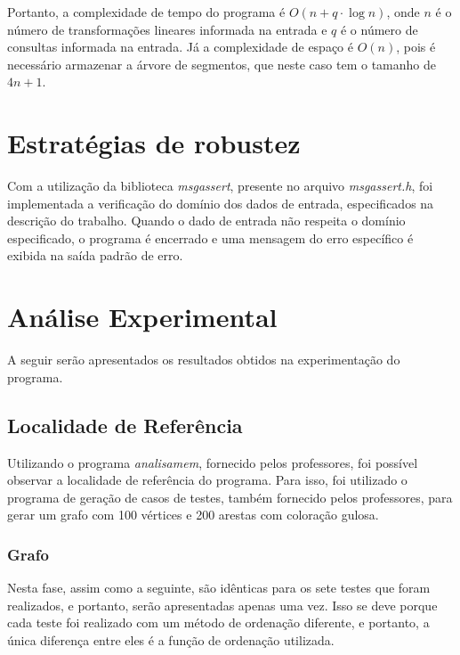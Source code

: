 \documentclass{article}
\begin{document}
Portanto, a complexidade de tempo do programa é $O(n + q \cdot \log n)$, onde $n$ é o número de transformações lineares informada na entrada e $q$ é o número de consultas informada na entrada.
Já a complexidade de espaço é $O(n)$, pois é necessário armazenar a árvore de segmentos, que neste caso tem o tamanho de $4n + 1$.

\section{Estratégias de robustez}
Com a utilização da biblioteca \emph{msgassert}, presente no arquivo \emph{msgassert.h}, foi implementada a verificação do domínio dos dados de entrada, especificados na descrição do trabalho. 
Quando o dado de entrada não respeita o domínio especificado, o programa é encerrado e uma mensagem do erro específico é exibida na saída padrão de erro.

\section{Análise Experimental}

A seguir serão apresentados os resultados obtidos na experimentação do programa.

\subsection{Localidade de Referência}

Utilizando o programa \emph{analisamem}, fornecido pelos professores, foi possível observar a localidade de referência do programa. 
Para isso, foi utilizado o programa de geração de casos de testes, também fornecido pelos professores, para gerar um grafo com 100 vértices e 200 arestas com coloração gulosa.

\subsubsection{Grafo }
Nesta fase, assim como a seguinte, são idênticas para os sete testes que foram realizados, e portanto, serão apresentadas apenas uma vez. Isso se deve porque cada teste foi realizado com um método de ordenação diferente, e portanto, a única diferença entre eles é a função de ordenação utilizada.
\end{document}
